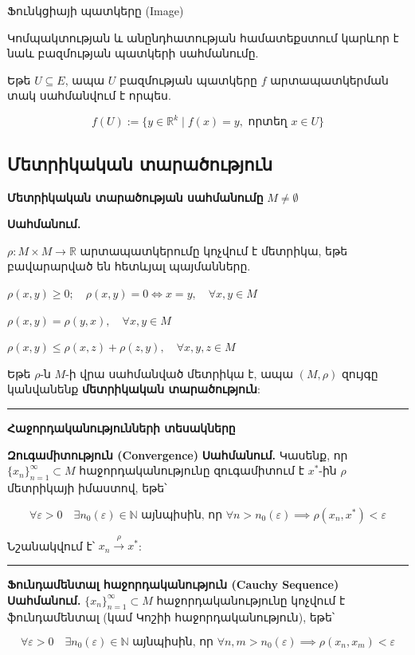 \documentclass[12pt, a4paper]{article}
\begin{document}
Ֆունկցիայի պատկերը (Image)

Կոմպակտության և անընդհատության համատեքստում կարևոր է նաև բազմության պատկերի սահմանումը.

Եթե $U \subseteq E$, ապա $U$ բազմության պատկերը $f$ արտապատկերման տակ սահմանվում է որպես.

$$f(U) := \{ y \in \mathbb{R}^k \mid f(x) = y, \text{ որտեղ } x \in U \}$$

\subsection{Մետրիկական տարածություն}

\textbf{Մետրիկական տարածության սահմանումը}
$M \neq \emptyset$

\textbf{Սահմանում.}

$\rho: M \times M \to \mathbb{R}$ արտապատկերումը կոչվում է մետրիկա, եթե բավարարված են հետևյալ պայմանները.

$\rho(x, y) \ge 0; \quad \rho(x, y) = 0 \iff x = y, \quad \forall x, y \in M$

$\rho(x, y) = \rho(y, x), \quad \forall x, y \in M$

$\rho(x, y) \le \rho(x, z) + \rho(z, y), \quad \forall x, y, z \in M$

Եթե $\rho$-ն $M$-ի վրա սահմանված մետրիկա է, ապա $(M, \rho)$ զույգը կանվանենք \textbf{մետրիկական տարածություն}:

\vspace{1em}
\hrule
\vspace{1em}

\textbf{Հաջորդականությունների տեսակները}

\textbf{Զուգամիտություն (Convergence)}
\textbf{Սահմանում.} Կասենք, որ $\{x_n\}_{n=1}^{\infty} \subset M$ հաջորդականությունը զուգամիտում է $x^*$-ին $\rho$ մետրիկայի իմաստով, եթե՝

$$\forall \varepsilon > 0 \quad \exists n_0(\varepsilon) \in \mathbb{N} \text{ այնպիսին, որ } \forall n > n_0(\varepsilon) \implies \rho(x_n, x^*) < \varepsilon$$

Նշանակվում է՝ $x_n \xrightarrow{\rho} x^*$:

\vspace{1em}
\hrule
\vspace{1em}

\textbf{Ֆունդամենտալ հաջորդականություն (Cauchy Sequence)}
\textbf{Սահմանում.} $\{x_n\}_{n=1}^{\infty} \subset M$ հաջորդականությունը կոչվում է ֆունդամենտալ (կամ Կոշիի հաջորդականություն), եթե՝

$$\forall \varepsilon > 0 \quad \exists n_0(\varepsilon) \in \mathbb{N} \text{ այնպիսին, որ } \forall n, m > n_0(\varepsilon) \implies \rho(x_n, x_m) < \varepsilon$$
\end{document}
